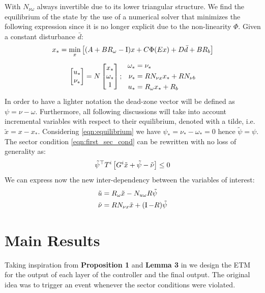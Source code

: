 \documentclass{article}
\begin{document}
With $N_{\nu \omega}$ always invertible due to its lower triangular structure. We find the equilibrium of the state by the use of a numerical solver that minimizes the following expression since it is no longer explicit due to the non-linearity $\Phi$. Given a constant disturbance $\bar{d}$:
\begin{equation}
  x_* = \min_{x} \left[(A + B R_{\omega} - \operatorname{I}) x + C \Phi(E x) + D \bar{d} + B R_b \right]
\end{equation}
\begin{equation}\label{eqn:equilibrium}
  \left[\begin{matrix}u_* \\ \nu_*\end{matrix}\right] = N \left[\begin{matrix}x_* \\ \omega_* \\ 1\end{matrix}\right]; \ \  
  \begin{aligned}
    \omega_* &= \nu_*\\
    \nu_* &= R N_{\nu x} x_* + R N_{\nu b}\\
    u_* &= R_{\omega} x_* + R_b
  \end{aligned}
\end{equation}
In order to have a lighter notation the dead-zone vector  will be defined as $\psi = \nu - \omega$. Furthermore, all following discussions will take into account incremental variables with respect to their equilibrium, denoted with a tilde, i.e. $\tilde{x} = x - x_*$. Considering \ref{eqn:equilibrium} we have $\psi_* = \nu_* - \omega_* = 0$ hence $\tilde{\psi} = \psi$. The sector condition \ref{eqn:first_sec_cond} can be rewritten with no loss of generality as:
\begin{equation}\label{eqn:sec_cond}
  \tilde{\psi}^\top T^i \left[ G^i \tilde{x} + \tilde{\psi} - \tilde{\nu} \right] \leq 0
\end{equation}
We can express now the new inter-dependency between the variables of interest:
\begin{equation}\label{eqn:incremental}
  \begin{aligned}
    \tilde{u} &= R_{\omega} \tilde{x} - N_{u \omega} R \tilde{\psi}\\
    \tilde{\nu} &= R N_{\nu x} \tilde{x} + (\operatorname{I} - R) \tilde{\psi}
  \end{aligned}
\end{equation}

\section{Main Results}
Taking inspiration from \textbf{Proposition 1} and \textbf{Lemma 3} in \cite{css-extended} we design the ETM for the output of each layer of the controller and the final output. The original idea was to trigger an event whenever the sector conditions were violated.
\end{document}
